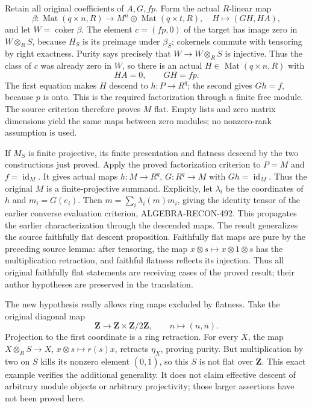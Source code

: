 Retain all original coefficients of \(A,G,fp\). Form the actual \(R\)-linear map \[
\beta:\operatorname{Mat}(q\times n,R)\longrightarrow
M^n\oplus\operatorname{Mat}(q\times t,R),
\quad H\longmapsto(GH,HA),
\] and let \(W=\operatorname{coker}\beta\). The element \(c=(fp,0)\) of the target has image zero in \(W\otimes_RS\), because \(H_S\) is its preimage under \(\beta_S\); cokernels commute with tensoring by right exactness. Purity says precisely that \(W\to W\otimes_RS\) is injective. Thus the class of \(c\) was already zero in \(W\), so there is an actual \(H\in\operatorname{Mat}(q\times n,R)\) with \[
HA=0,\qquad GH=fp.
\] The first equation makes \(H\) descend to \(h:P\to R^q\); the second gives \(Gh=f\), because \(p\) is onto. This is the required factorization through a finite free module. The source criterion therefore proves \(M\) flat. Empty lists and zero matrix dimensions yield the same maps between zero modules; no nonzero-rank assumption is used.

If \(M_S\) is finite projective, its finite presentation and flatness descend by the two constructions just proved. Apply the proved factorization criterion to \(P=M\) and \(f=\operatorname{id}_M\). It gives actual maps \(h:M\to R^q\), \(G:R^q\to M\) with \(Gh=\operatorname{id}_M\). Thus the original \(M\) is a finite-projective summand. Explicitly, let \(\lambda_i\) be the coordinates of \(h\) and \(m_i=G(e_i)\). Then \(m=\sum_i\lambda_i(m)m_i\), giving the identity tensor of the earlier converse evaluation criterion, ALGEBRA-RECON-492. This propagates the earlier characterization through the descended maps. The result generalizes the source faithfully flat descent proposition. Faithfully flat maps are pure by the preceding source lemma: after tensoring, the map \(x\otimes s\mapsto x\otimes1\otimes s\) has the multiplication retraction, and faithful flatness reflects its injection. Thus all original faithfully flat statements are receiving cases of the proved result; their author hypotheses are preserved in the translation.

The new hypothesis really allows ring maps excluded by flatness. Take the original diagonal map \[
\mathbf Z\longrightarrow\mathbf Z\times\mathbf Z/2\mathbf Z,
\qquad n\longmapsto(n,\overline n).
\] Projection to the first coordinate is a ring retraction. For every \(X\), the map \(X\otimes_RS\to X\), \(x\otimes s\mapsto r(s)x\), retracts \(\eta_X\), proving purity. But multiplication by two on \(S\) kills its nonzero element \((0,\overline1)\), so this \(S\) is not flat over \(\mathbf Z\). This exact example verifies the additional generality. It does not claim effective descent of arbitrary module objects or arbitrary projectivity; those larger assertions have not been proved here.

